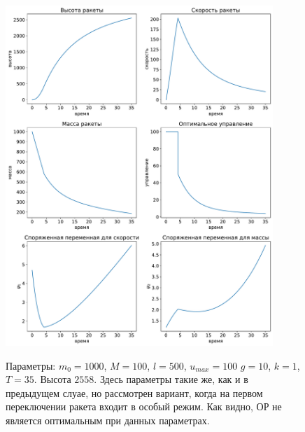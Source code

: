 \documentclass[12pt, a4paper]{article} %
\begin{document}
\begin{figure}[H]
\begin{center}
    \includegraphics[width=0.9\textwidth]{1_3.pdf}
    \label{fig:1_3}
    \caption{Параметры: $m_0=1000$, $M=100$,  $l=500$,  $u_{max}=100$
        $g=10$,  $k=1$,  $T=35$.
        Высота $2558$.
        Здесь параметры такие же, как и в предыдущем слуае, но рассмотрен вариант, когда на первом переключении ракета входит в особый режим.
        Как видно, ОР не является оптимальным при данных параметрах.}
\end{center} 
\end{figure}
\end{document}
